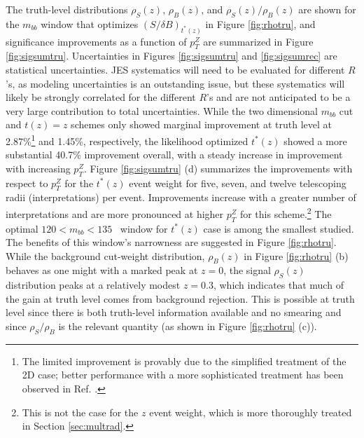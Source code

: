 The truth-level distributions $\rho_S\left(z\right)$, $\rho_B\left(z\right)$, and $\rho_S\left(z\right)/\rho_B\left(z\right)$ are shown for the $m_{bb}$ window that optimizes $(S/\delta B)_{t^*\left(z\right)}$ in Figure \ref{fig:rhotru}, and significance improvements as a function of $p_T^Z$ are summarized in Figure \ref{fig:sigsumtru}.  Uncertainties in Figures \ref{fig:sigsumtru} and \ref{fig:sigsumrec} are statistical uncertainties.  JES systematics will need to be evaluated for different $R$'s, as modeling uncertainties is an outstanding issue, but these systematics will likely be strongly correlated for the different $R$'s and are not anticipated to be a very large contribution to total uncertainties.  While the two dimensional $m_{bb}$ cut and $t\left(z\right)=z$ schemes only showed marginal improvement at truth level at 2.87\%\footnote{The limited improvement is provably due to the simplified treatment of the 2D case; better performance with a more sophisticated treatment has been observed in Ref. \cite{newschwartz}.}  and 1.45\%, respectively, the likelihood optimized $t^*\left(z\right)$ showed a more substantial 40.7\% improvement overall, with a steady increase in improvement with increasing $p_T^Z$.  Figure \ref{fig:sigsumtru} (d) summarizes the improvements with respect to $p_T^Z$ for the $t^*\left(z\right)$ event weight for five, seven, and twelve telescoping radii (interpretations) per event.  Improvements increase with a greater number of interpretations and are more pronounced at higher $p_T^Z$ for this scheme.\footnote{This is not the case for the $z$ event weight, which is more thoroughly treated in Section \ref{sec:multrad}.}  The optimal $120<m_{bb}<135$ \GeV\ window for $t^*\left(z\right)$ case is among the smallest studied.  The benefits of this window's narrowness are suggested in Figure \ref{fig:rhotru}.  While the background cut-weight distribution, $\rho_B\left(z\right)$ in Figure \ref{fig:rhotru} (b) behaves as one might with a marked peak at $z=0$, the signal $\rho_S\left(z\right)$ distribution peaks at a relatively modest $z=0.3$, which indicates that much of the gain at truth level comes from background rejection.  This is possible at truth level since there is both truth-level information available and no smearing and since $\rho_S/\rho_B$ is the relevant quantity (as shown in Figure \ref{fig:rhotru} (c)).

